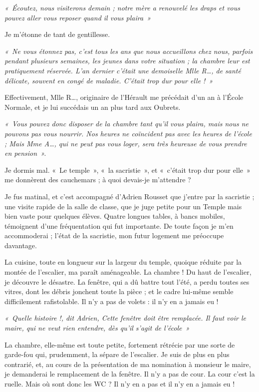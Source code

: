 \textit{«~Écoutez, nous visiterons demain ; notre mère a renouvelé les draps et vous
pouvez aller vous reposer quand il vous plaira~»}

Je m'étonne de tant de gentillesse.

\textit{«~Ne vous étonnez pas, c'est tous les ans que nous accueillons chez nous, parfois
pendant plusieurs semaines, les jeunes dans votre situation ; la chambre leur est
pratiquement réservée. L'an dernier c'était une demoiselle Mlle R…, de santé
délicate, souvent en congé de maladie. C'était trop dur pour elle !~»}

Effectivement, Mlle R…, originaire de l'Hérault me précédait d'un an à l'École
Normale, et je lui succédais un an plus tard aux Oubrets.

\textit{«~Vous pouvez donc disposer de la chambre tant qu'il vous plaira, mais nous ne
pouvons pas vous nourrir. Nos heures ne coïncident pas avec les heures de l'école ;
Mais Mme A…, qui ne peut pas vous loger, sera très heureuse de vous prendre en
pension~».}

Je dormis mal. «~Le temple~», «~la sacristie~», et «~c’était trop dur pour elle~» me
donnèrent des cauchemars ; à quoi devais-je m’attendre ?

Je fus matinal, et c’est accompagné d’Adrien Rousset que j’entre par la sacristie ;
une visite rapide de la salle de classe, que je juge petite pour un Temple mais bien
vaste pour quelques élèves. Quatre longues tables, à bancs mobiles, témoignent d’une
fréquentation qui fut importante. De toute façon je m’en accommoderai ; l’état de la
sacristie, mon futur logement me préoccupe davantage.

La cuisine, toute en longueur sur la largeur du temple, quoique réduite par la montée
de l’escalier, ma paraît aménageable. La chambre ! Du haut de l’escalier, je découvre
le désastre. La fenêtre, qui a dû battre tout l’été, a perdu toutes ses vitres, dont les
débris jonchent toute la pièce ; et le cadre lui-même semble difficilement rafistolable.
Il n’y a pas de volets : il n’y en a jamais eu !

\textit{«~Quelle histoire !, dit Adrien, Cette fenêtre doit être remplacée. Il faut voir le
maire, qui ne veut rien entendre, dès qu’il s’agit de l’école~»}

La chambre, elle-même est toute petite, fortement rétrécie par une sorte de garde-fou
qui, prudemment, la sépare de l’escalier.
Je suis de plus en plus contrarié, et, au cours de la présentation de ma nomination à
monsieur le maire, je demanderai le remplacement de la fenêtre.
Il n’y a pas de cour. La cour c’est la ruelle. Mais où sont donc les WC ? Il n’y en a
pas et il n’y en a jamais eu !

